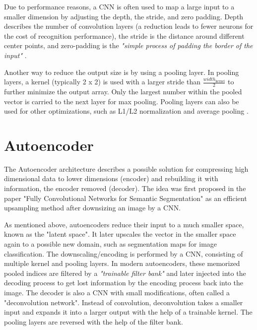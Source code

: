 Due to performance reasons, a CNN is often used to map a large input to a smaller dimension by adjusting the depth, the stride, and zero padding. Depth describes the number of convolution layers (a reduction leads to fewer neurons for the cost of recognition performance), the stride is the distance around different center points, and zero-padding is the \textit{"simple process of padding the border of the input"} \cite{oshea2015introductionconvolutionalneuralnetworks}.

Another way to reduce the output size is by using a pooling layer. In pooling layers, a kernel (typically 2 x 2) is used with a larger stride than $\frac{width_{\text{kernel}}}{2}$ to further minimize the output array. Only the largest number within the pooled vector is carried to the next layer for max pooling. Pooling layers can also be used for other optimizations, such as L1/L2 normalization \cite{Wu_2019} \cite{gholamalinezhad2020poolingmethodsdeepneural} and average pooling \cite{gholamalinezhad2020poolingmethodsdeepneural} \cite{oshea2015introductionconvolutionalneuralnetworks}.

\section{Autoencoder}
\label{sec:autoencoder}
The Autoencoder architecture describes a possible solution for compressing high dimensional data to lower dimensions (encoder) and rebuilding it with information, the encoder removed (decoder). The idea was first proposed in the paper "Fully Convolutional Networks for Semantic Segmentation" \cite{long2015fullyconvolutionalnetworkssemantic} as an efficient upsampling method after downsizing an image by a CNN.

As mentioned above, autoencoders reduce their input to a much smaller space, known as the "latent space". It later upscales the vector in the smaller space again to a possible new domain, such as segmentation maps for image classification. The downscaling/encoding is performed by a CNN, consisting of multiple kernel and pooling layers. In modern autoencoders, these memorized pooled indices are filtered by a \textit{"trainable filter bank"}\cite{badrinarayanan2015segnetdeepconvolutionalencoderdecoder} and later injected into the decoding process to get lost information by the encoding process back into the image. The decoder is also a CNN with small modifications, often called a "deconvolution network". Instead of convolution, deconvolution takes a smaller input and expands it into a larger output with the help of a trainable kernel. The pooling layers are reversed with the help of the filter bank.


